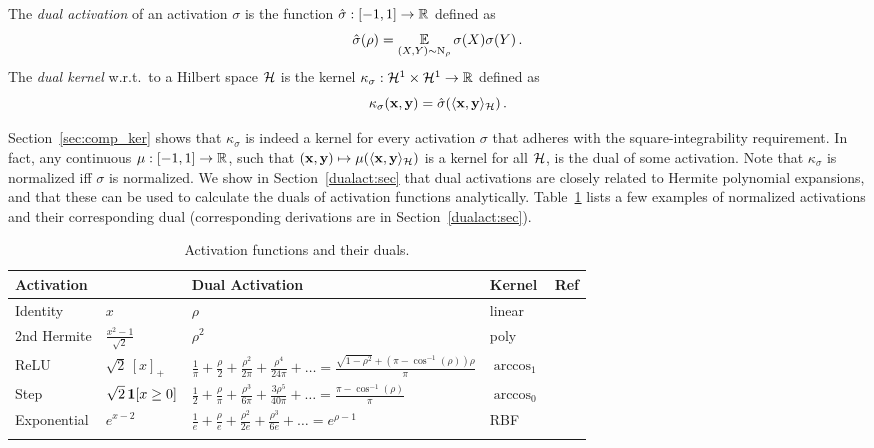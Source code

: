 \begin{definition}\label{def:dual_act}
%
The {\em dual activation} of an activation $\sigma$ is the function
$\hat{\sigma}:[-1,1]\to{\mathbb R}$ defined as
$$
\hat\sigma(\rho) =
	\operatorname*{\mathbb{E}}_{(X,Y) \sim \text{N}_\rho}\sigma(X)\sigma(Y) \,.
$$
The {\em dual kernel} w.r.t.\ to a Hilbert space ${\cal H}$ is the kernel
$\kappa_\sigma:{\cal H}^1\times {\cal H}^1\to{\mathbb R}$ defined as
$$\kappa_\sigma({\mathbf x},{\mathbf y}) = \hat{\sigma}(\langle {\mathbf x},{\mathbf y} \rangle_{\cal H}) \,.$$

%
\end{definition}
%
\noindent
Section~\ref{sec:comp_ker} shows that $\kappa_\sigma$ is indeed a kernel for every activation
$\sigma$ that adheres with the square-integrability requirement.
%
In fact,
any continuous $\mu:[-1,1]\to{\mathbb R}$, such that
$({\mathbf x},{\mathbf y})\mapsto\mu(\langle {\mathbf x},{\mathbf y} \rangle_{\cal H})$ is a kernel for all ${\cal H}$, is
the dual of some activation.
%
Note that $\kappa_\sigma$ is normalized iff $\sigma$ is normalized.
%
We show in Section~\ref{dualact:sec} that dual activations are closely
related to Hermite polynomial expansions, and that these can be used
to calculate the duals of activation functions analytically.
%
Table~\ref{tab:duals} lists a few examples of normalized activations
and their corresponding dual (corresponding derivations are in
Section~\ref{dualact:sec}).
%
{\renewcommand{\arraystretch}{1.3}%
\begin{table}[t]
\begin{center}
  \begin{tabular}{lllll}
    \hline
    Activation &  & Dual Activation & Kernel & Ref \\ \hline
    Identity & $x$ & $\rho$ & linear\\
    2nd Hermite & $\frac{x^2 - 1}{\sqrt{2}}$ & $\rho^2$ & poly &\\
    ReLU & $\sqrt{2}\,[x]_+$ &
		$\frac{1}{\pi}+\frac{\rho}{2} +
		 \frac{\rho^2}{2\pi} +
		 \frac{\rho^4}{24\pi} + \ldots
		 = \frac{\sqrt{1-\rho^2}+(\pi-\cos^{-1}(\rho))\rho}{\pi}$ &
		 $\arccos_1$  & \cite{cho2009kernel}\\
    Step & $\sqrt{2}\,\mathbf{1}[{x\ge 0}]$ &
			$\frac{1}{2} +
			 \frac{\rho}{\pi} +
			 \frac{\rho^3}{6\pi} +
			 \frac{3\rho^5}{40\pi} + \ldots = \frac{\pi-\cos^{-1}(\rho)}{\pi}$ &
			 $\arccos_0$ & \cite{cho2009kernel}\\
    Exponential & $e^{x-2}$ &
			$\frac{1}{e}+\frac{\rho}{e}+\frac{\rho^2}{2e}+\frac{\rho^3}{6e}+\ldots=
			e^{\rho-1}$ & RBF & \cite{mairal2014convolutional}\\
			& & & & \vspace{-16pt} \\
			\hline
  \end{tabular}
\caption{Activation functions and their duals.\label{tab:duals}}
\end{center}
\end{table}
}

